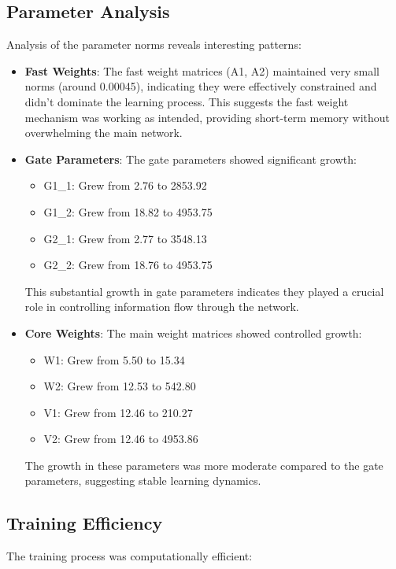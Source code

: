 \documentclass{article}
\begin{document}
\subsection{Parameter Analysis}
Analysis of the parameter norms reveals interesting patterns:

\begin{itemize}
    \item \textbf{Fast Weights}: The fast weight matrices (A1, A2) maintained very small norms (around 0.00045), indicating they were effectively constrained and didn't dominate the learning process. This suggests the fast weight mechanism was working as intended, providing short-term memory without overwhelming the main network.
    
    \item \textbf{Gate Parameters}: The gate parameters showed significant growth:
    \begin{itemize}
        \item G1\_1: Grew from 2.76 to 2853.92
        \item G1\_2: Grew from 18.82 to 4953.75
        \item G2\_1: Grew from 2.77 to 3548.13
        \item G2\_2: Grew from 18.76 to 4953.75
    \end{itemize}
    This substantial growth in gate parameters indicates they played a crucial role in controlling information flow through the network.
    
    \item \textbf{Core Weights}: The main weight matrices showed controlled growth:
    \begin{itemize}
        \item W1: Grew from 5.50 to 15.34
        \item W2: Grew from 12.53 to 542.80
        \item V1: Grew from 12.46 to 210.27
        \item V2: Grew from 12.46 to 4953.86
    \end{itemize}
    The growth in these parameters was more moderate compared to the gate parameters, suggesting stable learning dynamics.
\end{itemize}

\subsection{Training Efficiency}
The training process was computationally efficient:
\end{document}
